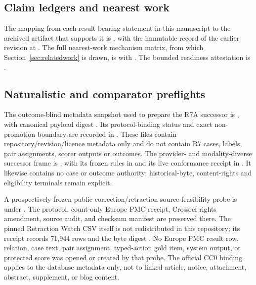 \subsection{Claim ledgers and nearest work}
The mapping from each result-bearing statement in this manuscript to the
archived artifact that supports it is , with the
immutable record of the earlier revision at .
The full nearest-work mechanism matrix, from which
Section~\ref{sec:relatedwork} is drawn, is
 with
. The bounded readiness attestation is
.

\subsection{Naturalistic and comparator preflights}
The outcome-blind metadata snapshot used to prepare the R7A successor is
,
with canonical payload digest
.
Its protocol-binding status and exact non-promotion boundary are recorded in
.
These files contain repository/revision/licence metadata only and do not contain
R7 cases, labels, pair assignments, scorer outputs or outcomes.
The provider- and modality-diverse successor frame is
,
with its frozen rules in
and its live conformance receipt in
.
It likewise contains no case or
outcome authority; historical-byte, content-rights and eligibility terminals
remain explicit.

A prospectively frozen public correction/retraction source-feasibility probe is
under
. The
protocol, count-only Europe PMC receipt, Crossref rights amendment, source
audit, and checksum manifest are preserved there. The pinned Retraction Watch
CSV itself is not redistributed in this repository; its receipt records 71,944
rows and the byte digest
.
No Europe PMC result row, relation, case text, pair assignment, typed-action
gold item, system output, or protected score was opened or created by that
probe. The official CC0 binding applies to the database metadata only, not to
linked article, notice, attachment, abstract, supplement, or blog content.

